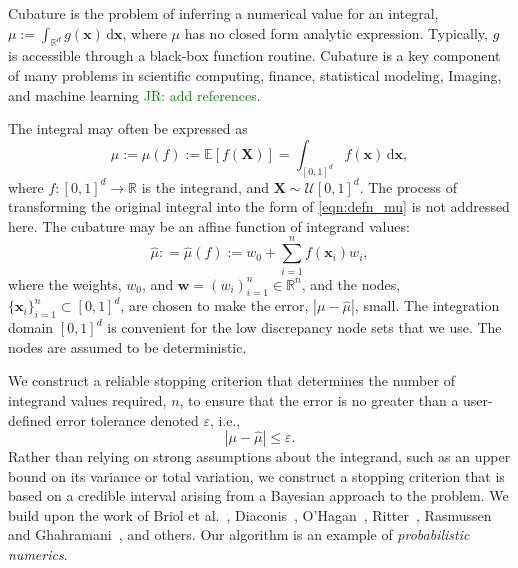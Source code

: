 \documentclass{iitthesis}          %
\newcommand{\bm}[1]{\boldsymbol{#1}}
\newcommand{\dif}[1]{\text{d}{#1}}
\newcommand{\reals}{\mathbb{R}}
\newcommand{\Ex}{\mathbb{E}}
\newcommand{\vw}{\bm{w}}
\newcommand{\vx}{\bm{x}}
\newcommand{\hmu}{\widehat{\mu}}
\newcommand{\errtol}{\varepsilon}
\def\abs#1{\ensuremath{\left \lvert #1 \right \rvert}}
\newcommand{\JRNote}[1]{{\textcolor{green}{JR: #1}}}
\begin{document}
\textpages     %




\label{intro}

Cubature is the problem of inferring a numerical value for an integral, 
$ \mu := \int_{\reals^d} g(\vx) \, \dif \vx$, where $\mu$ has no closed form analytic expression. Typically, $g$ is accessible through a black-box function routine. 
Cubature is a key component of many problems in scientific computing, finance, statistical modeling, Imaging, and machine learning \JRNote{add references}.  

The integral may often be expressed as
\begin{equation}
\label{eqn:defn_mu}
\mu:= \mu(f) := \Ex[f(\boldsymbol{X})] = \int_{[0,1]^d} f(\vx)\, \dif\vx, 
\end{equation}
where $f:[0,1]^d \to \reals$ is the integrand, and $\boldsymbol{X} \sim \mathcal{U}[0,1]^d$.  The process of transforming the original integral into the form of \eqref{eqn:defn_mu}  is not addressed here.  The cubature may be an affine function of integrand values:
\begin{equation}
\label{eqn:defn_hmu}  %
\hmu: = \hmu(f) := w_0 + \sum_{i=1}^{n} f(\vx_i) w_i,
\end{equation}
where the weights, $w_0$, and  $\vw = (w_i)_{i=1}^n \in \reals^n$, and the nodes, $\{\vx_i\}_{i=1}^n \subset [0,1]^d$, are chosen to make the error, $\abs{\mu - \hmu}$, small. The integration domain $[0,1]^d$ is convenient for the low discrepancy node sets that we use.  The nodes are assumed to be deterministic.


We construct a reliable stopping criterion that determines the number of integrand values required, $n$, to ensure that the error is no greater than a user-defined error tolerance denoted $\varepsilon$, i.e., 
\begin{equation}
\label{eqn:err_crit} 
\abs{\mu - \hmu} \leq \errtol .
\end{equation}
Rather than relying on strong assumptions about the integrand, such as an upper bound on its variance or total variation, we construct a stopping criterion that is based on a credible interval arising from a Bayesian approach to the problem.  We build upon the work of Briol et al.~\cite{BriEtal18a}, Diaconis~\cite{Dia88a}, O'Hagan~\cite{OHa91a}, Ritter~\cite{Rit00a}, Rasmussen and Ghahramani~\cite{RasGha03a}, and others.  Our algorithm is an example of \emph{probabilistic numerics}.
\end{document}
